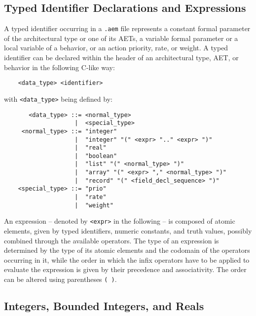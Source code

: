 \subsection{Typed Identifier Declarations and Expressions}\label{id_expr}

A typed identifier occurring in a {\tt .aem} file represents a constant formal parameter of the
architectural type or one of its AETs, a variable formal parameter or a local variable of a behavior, or an
action priority, rate, or weight. A typed identifier can be declared within the header of an architectural
type, AET, or behavior in the following C-like way:

	\begin{verbatim}
    <data_type> <identifier>
	\end{verbatim}

\noindent with {\tt <data\_type>} being defined by:

	\begin{verbatim}
       <data_type> ::= <normal_type>
                    |  <special_type>
     <normal_type> ::= "integer"
                    |  "integer" "(" <expr> ".." <expr> ")"
                    |  "real"
                    |  "boolean"
                    |  "list" "(" <normal_type> ")"
                    |  "array" "(" <expr> "," <normal_type> ")"
                    |  "record" "(" <field_decl_sequence> ")"
    <special_type> ::= "prio"
                    |  "rate"
                    |  "weight"
	\end{verbatim}

An expression -- denoted by {\tt <expr>} in the following -- is composed of atomic elements, given by typed
identifiers, numeric constants, and truth values, possibly combined through the available operators. The
type of an expression is determined by the type of its atomic elements and the codomain of the operators
occurring in it, while the order in which the infix operators have to be applied to evaluate the expression
is given by their precedence and associativity. The order can be altered using parentheses {\tt ( )}.


\subsection{Integers, Bounded Integers, and Reals}

